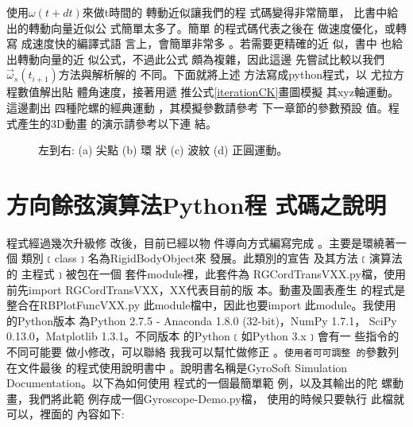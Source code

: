\documentclass[12pt,twoside]{article}
\begin{document}
\bigskip

使用$\omega (t+dt)$來做t時間的%
轉動近似讓我們的程%
式碼變得非常簡單，%
比書中\cite[Page 301, Equation 10.24]{titterton}給%
出的轉動向量近似公%
式簡單太多了。簡單%
的程式碼代表之後在%
做速度優化，或轉寫%
成速度快的編譯式語%
言上，會簡單非常多%
。若需要更精確的近%
似，書\cite[Page 301, Equation 10.24]{titterton}中%
也給出轉動向量的近%
似公式，不過此公式%
頗為複雜，因此這邊%
先嘗試比較以我們$\vec{\omega}%
_{s}(t_{i+1})$方法與解析解的%
不同。下面就將上述%
方法寫成python程式，以%
尤拉方程數值解出貼%
體角速度，接著用遞%
推公式\ref{iterationCK}畫圖模擬%
其xyz軸運動。這邊劃出%
四種陀螺的經典運動%
，其模擬參數請參考%
下一章節的參數預設%
值。程式產生的3D動畫%
的演示請參考以下連%
結。

\begin{center}
\href{http://tinypic.com/r/wk20ch/8}{\underline{\color{blue}%
}}
\end{center}

\begin{figure}[th]
\caption{{}左到右: (a) 尖點 (b) 環%
狀 (c) 波紋 (d) 正圓運動。}
\label{FourClassics}
\begin{center}
\fbox{\scalebox{1.2}[1.2]{}}
\end{center}
\end{figure}

\clearpage%

\part{方向餘弦演算法Python程%
式碼之說明}

\setcounter{page}{1}\bigskip

\bigskip

程式經過幾次升級修%
改後，目前已經以物%
件導向方式編寫完成%
。主要是環繞著一個%
類別﹝class﹞名為RigidBodyObject來%
發展。此類別的宣告%
及其方法﹝演算法的%
主程式﹞被包在一個%
套件module裡，此套件為%
RGCordTransVXX.py檔，使用前先import
RGCordTransVXX，XX代表目前的版%
本。動畫及圖表產生%
的程式是整合在RBPlotFuncVXX.py%
此module檔中，因此也要import%
此module。我使用的Python版本%
為Python 2.7.5 - Anaconda 1.8.0 (32-bit)，NumPy 1.7.1，%
SciPy 0.13.0，Matplotlib 1.3.1。不同版本%
的Python﹝如Python 3.x﹞會有一%
些指令的不同可能要%
做小修改，可以聯絡%
我我可以幫忙做修正%
。\texttt{使用者可可調整%
的}參數列在文件最後%
的程式使用說明書中%
。說明書名稱是GyroSoft Simulation
Documentation。以下為如何使用%
程式的一個最簡單範%
例，以及其輸出的陀%
螺動畫，我們將此範%
例存成一個Gyroscope-Demo.py檔，%
使用的時候只要執行%
此檔就可以，裡面的%
內容如下:
\end{document}
